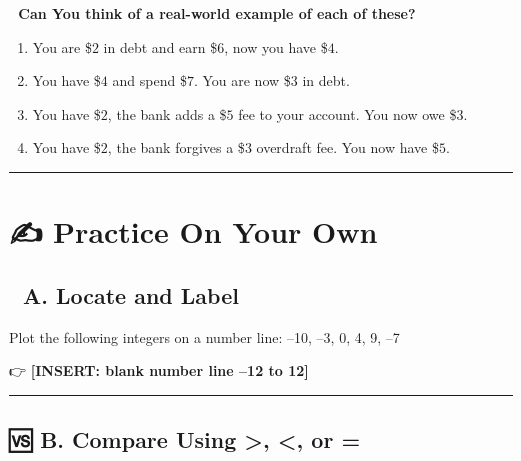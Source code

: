 \documentclass[
  letterpaper,
]{scrrept}
\providecommand{\tightlist}{%
  \setlength{\itemsep}{0pt}\setlength{\parskip}{0pt}}
\begin{document}
\begin{tcolorbox}[enhanced jigsaw, opacityback=0, colframe=quarto-callout-note-color-frame, rightrule=.15mm, breakable, arc=.35mm, colback=white, leftrule=.75mm, toprule=.15mm, bottomrule=.15mm, left=2mm]

\vspace{-3mm}\textbf{🧠 Can You think of a real-world example of each of these?}\vspace{3mm}

\begin{enumerate}
\def\labelenumi{\arabic{enumi}.}
\tightlist
\item
  You are \$\(2\) in debt and earn \$\(6\), now you have \$\(4\).
\item
  You have \$\(4\) and spend \$\(7\). You are now \$\(3\) in debt.
\item
  You have \$\(2\), the bank adds a \$\(5\) fee to your account. You now
  owe \$\(3\).
\item
  You have \$\(2\), the bank forgives a \$\(3\) overdraft fee. You now
  have \$\(5\).
\end{enumerate}

\end{tcolorbox}

\begin{center}\rule{0.5\linewidth}{0.5pt}\end{center}

\section*{✍️ Practice On Your Own}\label{practice-on-your-own}


\subsection*{🧭 A. Locate and Label}\label{a.-locate-and-label}

Plot the following integers on a number line: --10, --3, 0, 4, 9, --7

👉 \textbf{{[}INSERT: blank number line --12 to 12{]}}

\begin{center}\rule{0.5\linewidth}{0.5pt}\end{center}

\subsection*{🆚 B. Compare Using \textgreater, \textless, or
=}\label{b.-compare-using-or}
\end{document}
